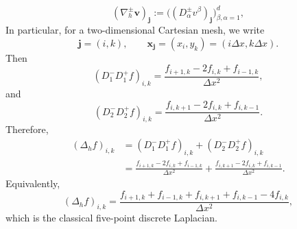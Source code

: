 \documentclass[11pt]{article}
\numberwithin{equation}{section}
\newtheorem{counter example}[theorem]{Counter Example}
\numberwithin{equation}{section}
\numberwithin{equation}{section}
\begin{document}
\[
(\nabla_h^{\pm}\mathbf v)_{\mathbf{j}}
:=
\big((D_\alpha^{\pm}v^\beta)_{\mathbf{j}}\big)_{\beta,\alpha=1}^d,
\]
In particular, for a two-dimensional Cartesian mesh, we write
\[
\mathbf j=(i,k),\qquad\mathbf x_{\mathbf j}=(x_i,y_k)=(i\Delta x,k\Delta x).
\]
Then
\[
(D_1^-D_1^+f)_{i,k}=\frac{f_{i+1,k}-2f_{i,k}+f_{i-1,k}}{\Delta x^2},
\]
and
\[
(D_2^-D_2^+f)_{i,k}=\frac{f_{i,k+1}-2f_{i,k}+f_{i,k-1}}{\Delta x^2}.
\]
Therefore,
\[
\begin{aligned}
(\Delta_h f)_{i,k}&=(D_1^-D_1^+f)_{i,k}+(D_2^-D_2^+f)_{i,k} \\
&=\frac{f_{i+1,k}-2f_{i,k}+f_{i-1,k}}{\Delta x^2}+\frac{f_{i,k+1}-2f_{i,k}+f_{i,k-1}}{\Delta x^2}.
\end{aligned}
\]
Equivalently,
\[
(\Delta_h f)_{i,k}=\frac{f_{i+1,k}+f_{i-1,k}+f_{i,k+1}+f_{i,k-1}-4f_{i,k}}{\Delta x^2},
\]
which is the classical five-point discrete Laplacian.
\end{document}
